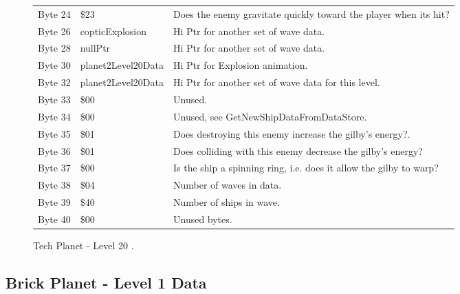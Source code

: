 \begin{figure}[H]
{\begin{adjustbox}{width=12cm}
\begin{tabular}{lll}
 Byte 24 & \$23                & Does the enemy gravitate quickly toward the player when its hit?   \\
 Byte 26 & copticExplosion    & Hi Ptr for another set of wave data.                               \\
 Byte 28 & nullPtr            & Hi Ptr for another set of wave data.                               \\
 Byte 30 & planet2Level20Data & Hi Ptr for Explosion animation.                                    \\
 Byte 32 & planet2Level20Data & Hi Ptr for another set of wave data for this level.                \\
 Byte 33 & \$00                & Unused.                                                            \\
 Byte 34 & \$00                & Unused, see GetNewShipDataFromDataStore.                           \\
 Byte 35 & \$01                & Does destroying this enemy increase the gilby's energy?.           \\
 Byte 36 & \$01                & Does colliding with this enemy decrease the gilby's energy?        \\
 Byte 37 & \$00                & Is the ship a spinning ring, i.e. does it allow the gilby to warp? \\
 Byte 38 & \$04                & Number of waves in data.                                           \\
 Byte 39 & \$40                & Number of ships in wave.                                           \\
 Byte 40 & \$00                & Unused bytes.                                                      \\
\bottomrule
\end{tabular}

  \end{adjustbox}

  }\caption*{Tech Planet - Level 20
.}
\end{figure}

\clearpage
\subsection{Brick Planet - Level 1 Data}

